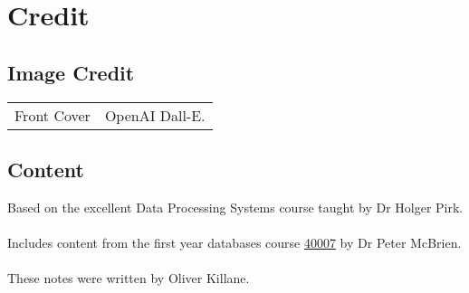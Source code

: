 \chapter{Credit}
\section*{Image Credit}
\begin{center}
	\begin{tabular}{r p{}}
        Front Cover & OpenAI Dall-E. \\
	\end{tabular}
\end{center}

\section*{Content}
Based on the excellent Data Processing Systems course taught by Dr Holger Pirk.
\\
\\ Includes content from the first year databases course \href{https://www.doc.ic.ac.uk/~pjm/idb/}{40007} by Dr Peter McBrien.
\\
\\ These notes were written by Oliver Killane.
